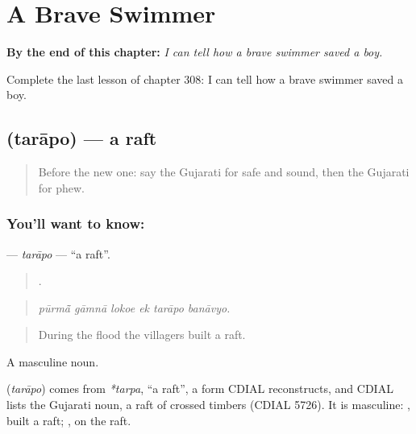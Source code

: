 
\chapter{A Brave Swimmer}
\label{ch:gu-a-brave-swimmer}

\begin{chapteropening}
\textbf{By the end of this chapter:} \emph{I can tell how a brave swimmer saved a boy.}

Complete the last lesson of chapter 308: I can tell how a brave swimmer saved a boy.
\end{chapteropening}

\section[\texorpdfstring{\gu{તરાપો} (tarāpo)}{તરાપો (tarāpo)}]{ (tarāpo) — a raft}

\label{lesson:GU-C308-tarapo}



\begin{quote}
Before the new one: say the Gujarati for safe and sound, then the Gujarati for phew.
\end{quote}

\subsection*{You'll want to know: }
\textbf{} — \emph{tarāpo} — \textquotedblleft{}a raft\textquotedblright{}.

\begin{quote}
     .
\end{quote}

\begin{quote}
\emph{pūrmā̃ gāmnā lokoe ek tarāpo banāvyo.}
\end{quote}

\begin{quote}
During the flood the villagers built a raft.
\end{quote}

A masculine noun.

\begin{cousinweb}
\textbf{} (\emph{tarāpo}) comes from \emph{*tarpa}, \textquotedblleft{}a raft\textquotedblright{}, a form CDIAL reconstructs, and CDIAL lists the Gujarati noun, a raft of crossed timbers (CDIAL 5726). It is masculine: \textbf{ }, built a raft; \textbf{ }, on the raft.
\end{cousinweb}

